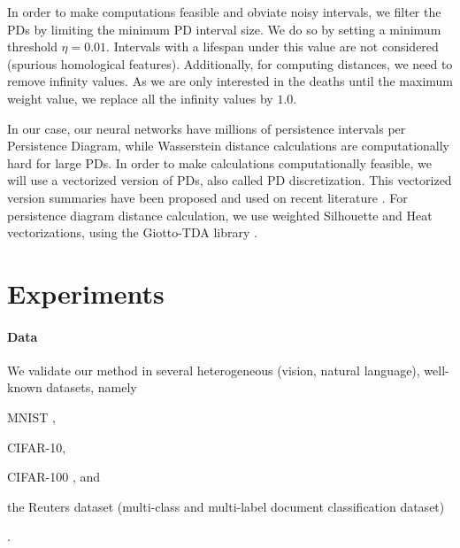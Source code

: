 \documentclass{article}
\begin{document}
In order to make computations feasible and obviate noisy intervals, we filter the PDs by limiting the minimum PD interval size. We do so by setting a minimum threshold $\eta = 0.01$. Intervals with a lifespan under this value are not considered (spurious homological features). Additionally, for computing distances, we need to remove infinity values. As we are only interested in the deaths until the maximum weight value, we replace all the infinity values by $1.0$.


In our case, our neural networks have millions of persistence intervals per Persistence Diagram, while Wasserstein distance calculations are computationally hard for large PDs. In order to make calculations computationally feasible, we will use a vectorized version of PDs, also called PD discretization. This vectorized version summaries have been proposed and used on recent literature \cite{Adams2017PersistenceIA, Berry2020FunctionalSO, Bubenik2015StatisticalTD, Lawson2019PersistentHF, Rieck2019TopologicalML}. For persistence diagram distance calculation, we use weighted Silhouette and Heat vectorizations, using the Giotto-TDA library \cite{tauzin2020giottotda}.






\section{Experiments}
\label{sec:experiments}

\paragraph{Data} We validate our method in several heterogeneous (vision, natural language), well-known datasets, namely \begin{enumerate*} \item MNIST \cite{lecun-mnisthandwrittendigit-2010}, \item CIFAR-10, \item CIFAR-100 \cite{Krizhevsky2009LearningML}, and \item the Reuters dataset \cite{Thom2017-reuters} (multi-class and multi-label document classification dataset) \end{enumerate*}. 
\end{document}
